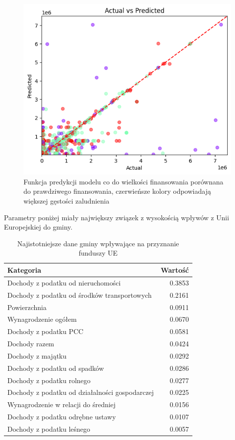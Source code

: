 \documentclass[12pt]{article}
\begin{document}
\begin{figure}[H]
\caption{Funkcja predykcji modelu co do wielkości finansowania porównana do prawdziwego finansowania, czerwieńsze kolory odpowiadają większej gęstości zaludnienia}
\centering
\includegraphics[width=1.0\textwidth]{output3.png}
\end{figure}
Parametry poniżej miały największy związek z wysokością wpływów z Unii Europejskiej do gminy.

\begin{table}[H]
    \centering
    \begin{tabular}{lr}
    \toprule
    \textbf{Kategoria} & \textbf{Wartość} \\
    \midrule
    Dochody z podatku od nieruchomości & 0.3853 \\
    Dochody z podatku od środków transportowych & 0.2161 \\
    Powierzchnia & 0.0911 \\
    Wynagrodzenie ogółem & 0.0670 \\
    Dochody z podatku PCC & 0.0581 \\
    Dochody razem & 0.0424 \\
    Dochody z majątku & 0.0292 \\
    Dochody z podatku od spadków & 0.0286 \\
    Dochody z podatku rolnego & 0.0277 \\
    Dochody z podatku od działalności gospodarczej & 0.0225 \\
    Wynagrodzenie w relacji do średniej & 0.0156 \\
    Dochody z podatku odrębne ustawy & 0.0107 \\
    Dochody z podatku leśnego & 0.0057 \\
    \bottomrule
    \end{tabular}
    \caption{Najistotniejsze dane gminy wpływające na przyznanie funduszy UE}
\end{table}
\end{document}
